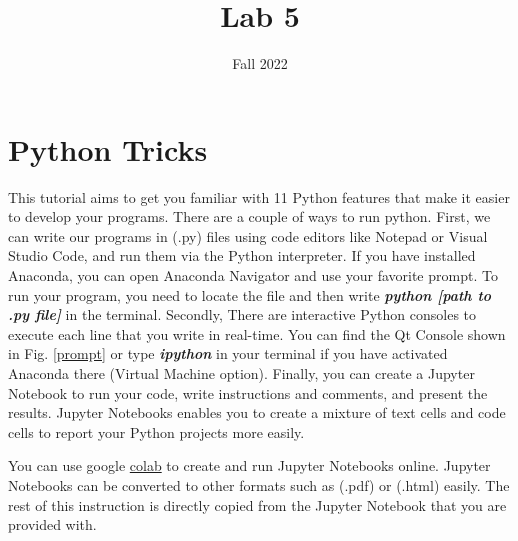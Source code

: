 \documentclass{homework}
\author{}
\date{Fall 2022}
\title{Lab 5}
\begin{document}
 \maketitle

\section{Python Tricks}
This tutorial aims to get you familiar with 11 Python features that make it easier to develop your programs. There are a couple of ways to run python. First, we can write our programs in (.py) files using code editors like Notepad or Visual Studio Code, and run them via the Python interpreter. If you have installed Anaconda, you can open Anaconda Navigator and use your favorite prompt.
To run your program, you need to locate the file and then write \textbf{\textit{python [path to .py file]}} in the terminal.
Secondly, There are interactive Python consoles to execute each line that you write in real-time. You can find the Qt Console shown in Fig. \ref{prompt} or type \textbf{\textit{ipython}} in your terminal if you have activated Anaconda there (Virtual Machine option). Finally, you can create a Jupyter Notebook to run your code, write instructions and comments, and present the results. Jupyter Notebooks enables you to create a mixture of text cells and code cells to report your Python projects more easily.

You can use google \href{https://colab.research.google.com/}{colab} to create and run Jupyter Notebooks online. Jupyter Notebooks can be converted to other formats such as (.pdf) or (.html) easily. The rest of this instruction is directly copied from the Jupyter Notebook that you are provided with.
\newpage


\end{document}

